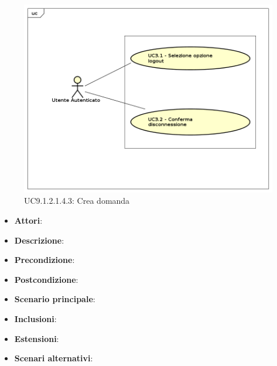 						\label{UC9.1.2.1.4.3}
						\begin{figure}[h]
							\centering
						\includegraphics[scale=0.7,keepaspectratio]{UML/UC9.png}
							\caption{UC9.1.2.1.4.3: Crea domanda}
						\end{figure}
						\FloatBarrier
						\begin{itemize}
							\item \textbf{Attori}: 
							\item \textbf{Descrizione}: 
							\item \textbf{Precondizione}: 
							\item \textbf{Postcondizione}: 
							\item \textbf{Scenario principale}:
							\item \textbf{Inclusioni}:
							\item \textbf{Estensioni}:
							\item \textbf{Scenari alternativi}:
						\end{itemize}
						
